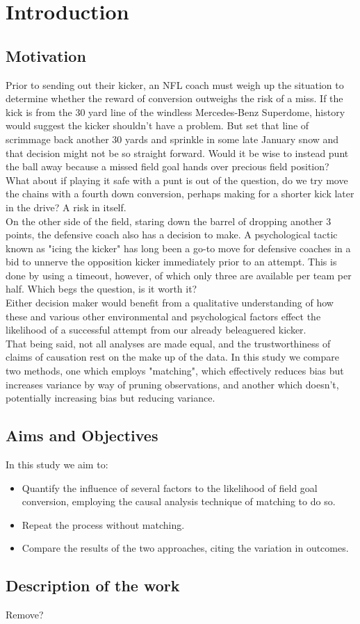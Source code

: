 \chapter{Introduction}

\section{Motivation}

Prior to sending out their kicker, an NFL coach must weigh up the situation to determine whether the reward of conversion outweighs the risk of a miss. If the kick is from the 30 yard line of the windless Mercedes-Benz Superdome, history would suggest the kicker shouldn't have a problem. But set that line of scrimmage back another 30 yards and sprinkle in some late January snow and that decision might not be so straight forward. Would it be wise to instead punt the ball away because a missed field goal hands over precious field position? What about if playing it safe with a punt is out of the question, do we try move the chains with a fourth down conversion, perhaps making for a shorter kick later in the drive? A risk in itself.\\
On the other side of the field, staring down the barrel of dropping another 3 points, the defensive coach also has a decision to make. A psychological tactic known as "icing the kicker" has long been a go-to move for defensive coaches in a bid to unnerve the opposition kicker immediately prior to an attempt. This is done by using a timeout, however, of which only three are available per team per half. Which begs the question, is it worth it?\\
Either decision maker would benefit from a qualitative understanding of how these and various other environmental and psychological factors effect the likelihood of a successful attempt from our already beleaguered kicker.\\
That being said, not all analyses are made equal, and the trustworthiness of claims of causation rest on the make up of the data. In this study we compare two methods, one which employs "matching", which effectively reduces bias but increases variance by way of pruning observations, and another which doesn't, potentially increasing bias but reducing variance.

\section{Aims and Objectives}
In this study we aim to:
\begin{itemize}
    \item Quantify the influence of several factors to the likelihood of field goal conversion, employing the causal analysis technique of matching to do so.
    \item Repeat the process without matching.
    \item Compare the results of the two approaches, citing the variation in outcomes.
\end{itemize}


\section{Description of the work}
Remove?


